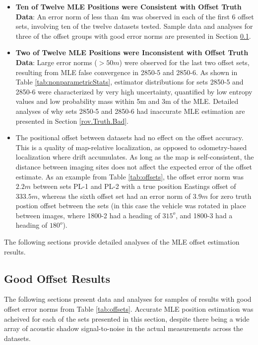 \begin{itemize}
\item \textbf{Ten of Twelve MLE Positions were Consistent with Offset Truth Data}: An error norm of less than 4m was observed in each of the first 6 offset sets, involving ten of the twelve datasets tested. Sample data and analyses for three of the offset groups with good error norms are presented in Section \ref{rov.Truth.Good}.
\item \textbf{Two of Twelve MLE Positions were Inconsistent with Offset Truth Data}: Large error norms ($>50m$) were observed for the last two offset sets, resulting from MLE false convergence in 2850-5 and 2850-6. As shown in Table \ref{tab:nonparametricStats}, estimator distributions for sets 2850-5 and 2850-6 were characterized by very high uncertainty, quantified by low entropy values and low probability mass within 5m and 3m of the MLE.  Detailed analyses of why sets 2850-5 and 2850-6 had inaccurate MLE estimation are presented in Section \ref{rov.Truth.Bad}.
\item The positional offset between datasets had no effect on the offset accuracy.  This is a quality of map-relative localization, as opposed to odometry-based localization where drift accumulates.  As long as the map is self-consistent, the distance between imaging sites does not affect the expected error of the offset estimate.  As an example from Table \ref{tab:offsets}, the offset error norm was $2.2m$ between sets PL-1 and PL-2 with a true position Eastings offset of $333.5m$, whereas the sixth offset set had an error norm of $3.9m$ for zero truth postion offset between the sets (in this case the vehicle was rotated in place between images, where 1800-2 had a heading of $315^{o}$, and 1800-3 had a heading of $180^{o}$). 
\end{itemize}

\noindent The following sections provide detailed analyses of the MLE offset estimation results.  

\subsection{Good Offset Results}
\label{rov.Truth.Good}

The following sections present data and analyses for samples of results with good offset error norms from Table \ref{tab:offsets}.
Accurate MLE position estimation was acheived for each of the sets presented in this section, despite there being a wide array of acoustic shadow signal-to-noise in the actual measurements across the datasets.

